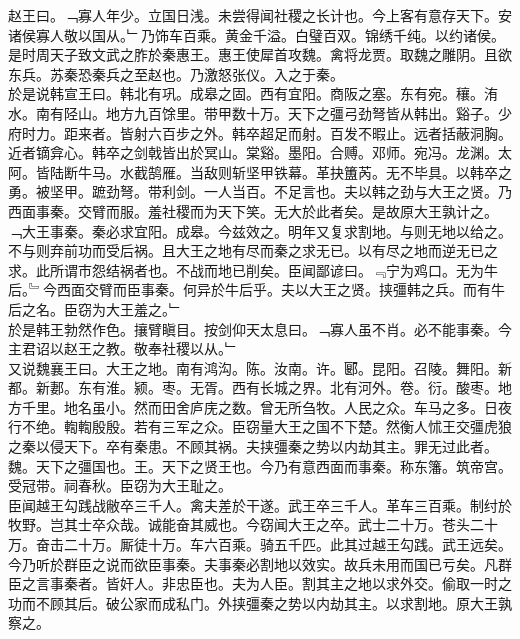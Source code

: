\documentclass{zhvt-classic}
\begin{document}
\hspace*{2em}赵王曰。﹁寡人年少。立国日浅。未尝得闻社稷之长计也。今上客有意存天下。安诸侯寡人敬以国从。﹂乃饰车百乘。黄金千溢。白璧百双。锦绣千纯。以约诸侯。\\
\hspace*{2em}是时周天子致文武之胙於秦惠王。惠王使犀首攻魏。禽将龙贾。取魏之雕阴。且欲东兵。苏秦恐秦兵之至赵也。乃激怒张仪。入之于秦。\\
\hspace*{2em}於是说韩宣王曰。韩北有巩。成皋之固。西有宜阳。商阪之塞。东有宛。穰。洧水。南有陉山。地方九百馀里。带甲数十万。天下之彊弓劲弩皆从韩出。谿子。少府时力。距来者。皆射六百步之外。韩卒超足而射。百发不暇止。远者括蔽洞胸。近者镝弇心。韩卒之剑戟皆出於冥山。棠谿。墨阳。合赙。邓师。宛冯。龙渊。太阿。皆陆断牛马。水截鹄雁。当敌则斩坚甲铁幕。革抉簠芮。无不毕具。以韩卒之勇。被坚甲。蹠劲弩。带利剑。一人当百。不足言也。夫以韩之劲与大王之贤。乃西面事秦。交臂而服。羞社稷而为天下笑。无大於此者矣。是故原大王孰计之。\\
\hspace*{2em}﹁大王事秦。秦必求宜阳。成皋。今兹效之。明年又复求割地。与则无地以给之。不与则弃前功而受后祸。且大王之地有尽而秦之求无已。以有尽之地而逆无已之求。此所谓市怨结祸者也。不战而地已削矣。臣闻鄙谚曰。﹃宁为鸡口。无为牛后。﹄今西面交臂而臣事秦。何异於牛后乎。夫以大王之贤。挟彊韩之兵。而有牛后之名。臣窃为大王羞之。﹂\\
\hspace*{2em}於是韩王勃然作色。攘臂瞋目。按剑仰天太息曰。﹁寡人虽不肖。必不能事秦。今主君诏以赵王之教。敬奉社稷以从。﹂\\
\hspace*{2em}又说魏襄王曰。大王之地。南有鸿沟。陈。汝南。许。郾。昆阳。召陵。舞阳。新都。新郪。东有淮。颍。枣。无胥。西有长城之界。北有河外。卷。衍。酸枣。地方千里。地名虽小。然而田舍庐庑之数。曾无所刍牧。人民之众。车马之多。日夜行不绝。輷輷殷殷。若有三军之众。臣窃量大王之国不下楚。然衡人怵王交彊虎狼之秦以侵天下。卒有秦患。不顾其祸。夫挟彊秦之势以内劫其主。罪无过此者。魏。天下之彊国也。王。天下之贤王也。今乃有意西面而事秦。称东籓。筑帝宫。受冠带。祠春秋。臣窃为大王耻之。\\
\hspace*{2em}臣闻越王勾践战敝卒三千人。禽夫差於干遂。武王卒三千人。革车三百乘。制纣於牧野。岂其士卒众哉。诚能奋其威也。今窃闻大王之卒。武士二十万。苍头二十万。奋击二十万。厮徒十万。车六百乘。骑五千匹。此其过越王勾践。武王远矣。今乃听於群臣之说而欲臣事秦。夫事秦必割地以效实。故兵未用而国已亏矣。凡群臣之言事秦者。皆奸人。非忠臣也。夫为人臣。割其主之地以求外交。偷取一时之功而不顾其后。破公家而成私门。外挟彊秦之势以内劫其主。以求割地。原大王孰察之。\\
\end{document}
